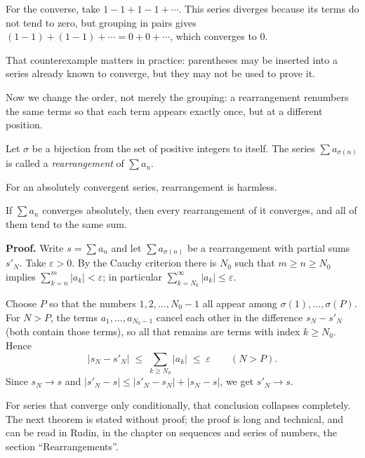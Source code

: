 For the converse, take $1 - 1 + 1 - 1 + \cdots$. This series diverges because its terms do
not tend to zero, but grouping in pairs gives $(1-1) + (1-1) + \cdots = 0 + 0 + \cdots$,
which converges to $0$.

That counterexample matters in practice: parentheses may be inserted into a series already
known to converge, but they may not be used to prove it.

Now we change the order, not merely the grouping: a rearrangement renumbers the same terms
so that each term appears exactly once, but at a different position.

\begin{definisi}
Let $\sigma$ be a bijection from the set of positive integers to itself. The series
$\sum a_{\sigma(n)}$ is called a \emph{rearrangement} of $\sum a_n$.
\end{definisi}


For an absolutely convergent series, rearrangement is harmless.

\begin{teorema}
If $\sum a_n$ converges absolutely, then every rearrangement of it converges, and all of
them tend to the same sum.
\end{teorema}

\noindent\textbf{Proof.} Write $s = \sum a_n$ and let $\sum a_{\sigma(n)}$ be a
rearrangement with partial sums $s'_N$. Take $\varepsilon > 0$. By the Cauchy criterion
there is $N_0$ such that $m \ge n \ge N_0$ implies $\sum_{k=n}^{m} |a_k| < \varepsilon$; in
particular $\sum_{k=N_0}^{\infty} |a_k| \le \varepsilon$.

Choose $P$ so that the numbers $1, 2, \ldots, N_0-1$ all appear among
$\sigma(1), \ldots, \sigma(P)$. For $N > P$, the terms $a_1, \ldots, a_{N_0-1}$ cancel each
other in the difference $s_N - s'_N$ (both contain those terms), so all that remains are
terms with index $k \ge N_0$. Hence
\[
  \left| s_N - s'_N \right| \;\le\; \sum_{k \ge N_0} |a_k| \;\le\; \varepsilon
  \qquad (N > P).
\]
Since $s_N \to s$ and $\left| s'_N - s \right| \le \left| s'_N - s_N \right| +
\left| s_N - s \right|$, we get $s'_N \to s$.

For series that converge only conditionally, that conclusion collapses completely. The next
theorem is stated without proof; the proof is long and technical, and can be read in Rudin,
in the chapter on sequences and series of numbers, the section ``Rearrangements''.

